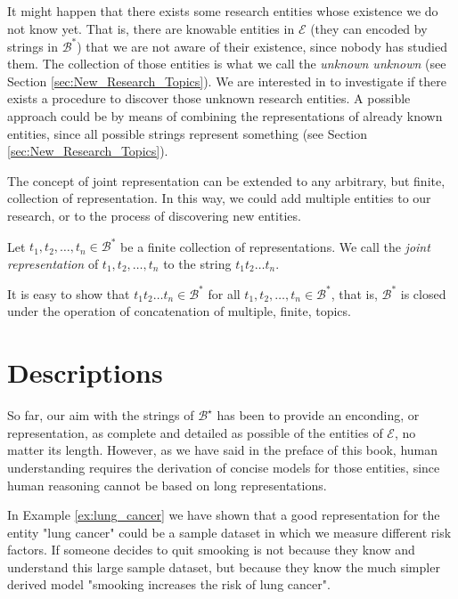 It might happen that there exists some research entities whose existence we do not know yet. That is, there are knowable entities in $\mathcal{E}$ (they can encoded by strings in $\mathcal{B}^\ast$) that we are not aware of their existence, since nobody has studied them. The collection of those entities is what we call the \emph{unknown unknown} (see Section \ref{sec:New_Research_Topics}). We are interested in to investigate if there exists a procedure to discover those unknown research entities. A possible approach could be by means of combining the representations of already known entities, since all possible strings represent something (see Section \ref{sec:New_Research_Topics}).

The concept of joint representation can be extended to any arbitrary, but finite, collection of representation. In this way, we could add multiple entities to our research, or to the process of discovering new entities.

\begin{definition}
Let $t_1, t_2, \ldots, t_n \in \mathcal{B}^\ast$ be a finite collection of representations. We call the \emph{joint representation} of $t_1, t_2, \ldots, t_n$ to the string $t_1 t_2 \ldots t_n$.
\end{definition}

It is easy to show that $t_1 t_2 \ldots t_n \in \mathcal{B}^\ast$ for all $t_1, t_2, \ldots, t_n \in \mathcal{B}^\ast$, that is, $\mathcal{B}^\ast$ is closed under the operation of concatenation of multiple, finite, topics.

%
%

\section{Descriptions}
\label{sec:descriptions_models}

So far, our aim with the strings of $\mathcal{B}^\star$ has been to provide an enconding, or representation, as complete and detailed as possible of the entities of $\mathcal{E}$, no matter its length. However, as we have said in the preface of this book, human understanding requires the derivation of concise models for those entities, since human reasoning cannot be based on long representations.

\begin{example}
In Example \ref{ex:lung_cancer} we have shown that a good representation for the entity "lung cancer" could be a sample dataset in which we measure different risk factors. If someone decides to quit smooking is not because they know and understand this large sample dataset, but because they know the much simpler derived model "smooking increases the risk of lung cancer".
\end{example}

